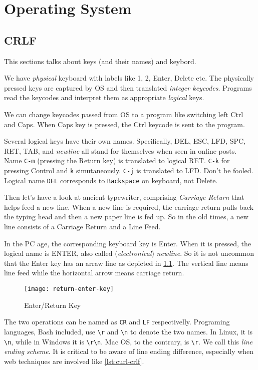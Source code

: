 \chapter{Operating System}
\label{cha:operating-system}

\lstset{language=bash}

\section{CRLF}
\label{sec:crlf}

This sections talks about keys (and their names) and keybord.

We have \textit{physical} keyboard with labels like 1, 2, Enter,
Delete etc. The physically pressed keys are captured by OS and
then translated \textit{integer keycodes}. Programs read the
keycodes and interpret them as appropriate \textit{logical}
keys.

We can change keycodes passed from OS to a program like switching
left Ctrl and Caps. When Caps key is pressed, the Ctrl keycode is
sent to the program.

Several logical keys have their own names. Specifically, DEL, ESC,
LFD, SPC, RET, TAB, and \textit{newline} all stand for themselves
when seen in online posts. Name \verb|C-m| (pressing the
Return key) is translated to logical RET. \verb|C-k| for
pressing Control and \verb|k| simutaneously. \verb|C-j| is
translated to LFD. Don't be fooled. Logical name \verb|DEL|
corresponds to \verb|Backspace| on keyboard, not Delete.

Then let's have a look at ancient typewriter, comprising
\textit{Carriage Return} that helps feed a new line. When a new
line is required, the carriage return pulls back the typing head
and then a new paper line is fed up. So in the old times, a new
line consists of a Carriage Return and a Line Feed.

In the PC age, the corresponding keyboard key is Enter. When it is
pressed, the logical name is ENTER, also called
(\textit{electronical}) \textit{newline}. So it is not uncommon
that the Enter key has an arraw line as depicted in
\ref{fig:enter-return-key}. The vertical line means line feed
while the horizontal arrow means carriage return.

\begin{figure}
  \centering
  \texttt{[image: return-enter-key]}
  \caption{Enter/Return Key}
  \label{fig:enter-return-key}
\end{figure}

The two operations can be named as \verb|CR| and \verb|LF|
respectivelly. Programing languages, Bash included, use
\lstinline|\r| and \lstinline|\n| to denote the two names. In
Linux, it is \verb|\n|, while in Windows it is \verb|\r\n|. Mac
OS, to the contrary, is \verb|\r|. We call this \textit{line
  ending scheme}. It is critical to be aware of line ending
difference, especially when web techniques are involved like
\ref{lst:curl-crlf}.

